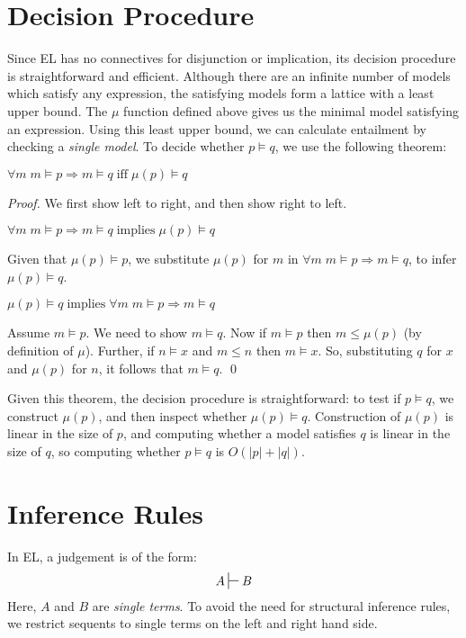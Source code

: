 \section{Decision Procedure}
Since EL has no connectives for disjunction or implication, its decision procedure is straightforward and efficient. 
Although there are an infinite number of models which satisfy any expression, the satisfying models form a lattice with a least upper bound. 
The $\mu$ function defined above gives us the minimal model satisfying an expression.
Using this least upper bound, we can calculate entailment by checking a \emph{single model}.
To decide whether $p \models q$,  we use the following theorem:
\begin{theorem} $\forall m \; m \models p \Rightarrow m \models q \; \text{iff} \; \mu(p) \models q $
\end{theorem}
\begin{proof}
We first show left to right, and then show right to left.
\setcounter{mycase}{0}
\begin{mycase}
$\forall m \; m \models p \Rightarrow m \models q \; \text{implies} \; \mu(p) \models q$
\end{mycase}
Given that $\mu(p) \models p$, we substitute $\mu(p)$ for $m$ in $\forall m \; m \models p \Rightarrow m \models q$, to infer $\mu(p) \models q$.
\begin{mycase}
$\mu(p) \models q \; \text{implies} \; \forall m \; m \models p \Rightarrow m \models q$
\end{mycase}
Assume $m \models p$. We need to show $m \models q$.
Now if $m \models p$ then $m \leq \mu(p)$ (by definition of $\mu$).
Further, if $n \models x$ and $m \leq n$ then $m \models x$. So, substituting $q$ for $x$ and $\mu(p)$ for $n$, it follows that $m \models q$. 
\qed
\end{proof}
Given this theorem, the decision procedure is straightforward: to test if $p \models q$, we construct $\mu(p)$, and then inspect whether $\mu(p) \models q$.
Construction of $\mu(p)$ is linear in the size of $p$, and computing whether a model satisfies $q$ is linear in the size of $q$, so computing whether $p \models q$ is $O(|p|+|q|)$.

\section{Inference Rules}
In EL, a judgement is of the form:
\[
A \judge B
\]
Here, $A$ and $B$ are \emph{single terms}.
To avoid the need for structural inference rules, we restrict sequents to single terms on the left and right hand side.

